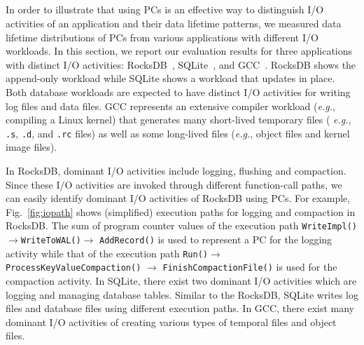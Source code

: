 \vspace{-10pt}
\subsection{}
\vspace{-5pt}
In order to illustrate that using PCs is an effective way to distinguish I/O
activities of an application and their data lifetime patterns, we measured data
lifetime distributions of PCs from various applications with different I/O
workloads.  In this section, we report our evaluation results for three
applications with distinct I/O activities: RocksDB~\cite{RocksDB},
SQLite~\cite{SQLite}, and GCC~\cite{GCC}.  RocksDB shows the append-only
workload while SQLite shows a workload that updates in place.  Both database
workloads are expected to have distinct I/O activities for writing log files
and data files.  GCC represents an extensive compiler workload ({\it e.g.},
compiling a Linux kernel) that generates many short-lived temporary files ({\it
e.g.}, \texttt{.s}, \texttt{.d}, and \texttt{.rc} files) as well as some
long-lived files ({\it e.g.}, object files and kernel image files).

In RocksDB, dominant I/O activities include logging, flushing and compaction.
Since these I/O activities are invoked through different function-call paths,
we can easily identify dominant I/O activities of RocksDB using PCs.  For
example, Fig.~\ref{fig:iopath} shows (simplified) execution paths for logging
and compaction in RocksDB.  The sum of program counter values of the execution
path \texttt{WriteImpl()}$\rightarrow$\texttt{WriteToWAL()}$\rightarrow$
\texttt{AddRecord()} is used to represent a PC for the logging activity while
that of the execution path \texttt{Run()}$\rightarrow$
\texttt{ProcessKeyValueCompaction()} $\rightarrow$
\texttt{FinishCompactionFile()} is used for the compaction activity.
In SQLite, there exist two dominant I/O activities which are logging and
managing database tables.  Similar to the RocksDB, SQLite writes log files and
database files using different execution paths.  In GCC, there exist many
dominant I/O activities of creating various types of temporal files and object
files.


